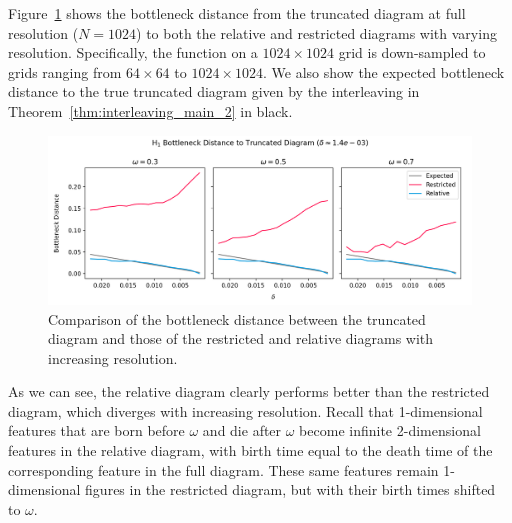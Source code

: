 
Figure~\ref{fig:bottleneck} shows the bottleneck distance from the truncated diagram at full resolution ($N = 1024$) to both the relative and restricted diagrams with varying resolution.
Specifically, the function on a $1024\times 1024$ grid is down-sampled to grids ranging from $64\times 64$ to $1024\times 1024$.
We also show the expected bottleneck distance to the true truncated diagram given by the interleaving in Theorem~\ref{thm:interleaving_main_2} in black.

\begin{figure}[htbp]\label{fig:bottleneck}
  \centering
  \includegraphics[width=\textwidth]{scripts/figures/matching2/bottleneck_delta.png}
  \caption{Comparison of the bottleneck distance between the truncated diagram and those of the restricted and relative diagrams with increasing resolution.}
\end{figure}

As we can see, the relative diagram clearly performs better than the restricted diagram, which diverges with increasing resolution.
Recall that 1-dimensional features that are born before $\omega$ and die after $\omega$ become infinite 2-dimensional features in the relative diagram, with birth time equal to the death time of the corresponding feature in the full diagram.
These same features remain 1-dimensional figures in the restricted diagram, but with their birth times shifted to $\omega$.


